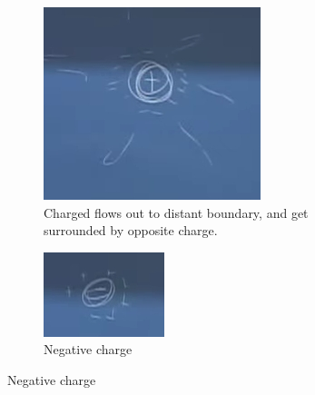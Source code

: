 \documentclass[]{article}
\begin{document}
\begin{figure}[H]
	\caption{Charged conductor}
	\begin{subfigure}[t]{0.45\textwidth}
		\caption{Charged flows out to distant boundary, and get surrounded by opposite charge.}\label{fig:2-10-charged-conductor}
		\includegraphics[width=\textwidth]{2-10-charged-conductor}
	\end{subfigure}
	\begin{subfigure}[t]{0.45\textwidth}
		\caption{Negative charge}\label{fig:2-10-neg-charged-conductor}
		\includegraphics[width=\textwidth]{2-10-neg-charged-conductor}
	\end{subfigure}
\end{figure}
\end{document}
